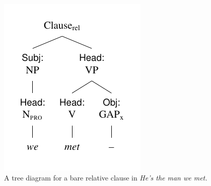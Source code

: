 \begin{figure}[ht]
    \centering
    \includegraphics{figures/we-met.pdf}
    \caption{A tree diagram for a bare relative clause in \textit{He's the man we met.}}
    \label{fig:we-met}
\end{figure}

